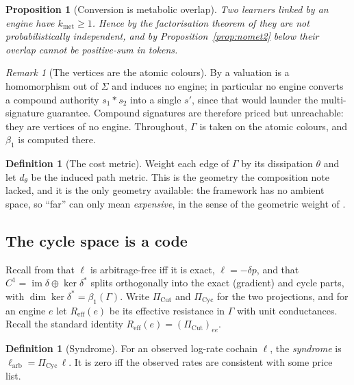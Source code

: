 \documentclass[11pt]{article}
\theoremstyle{plain}
\newtheorem{proposition}[theorem]{Proposition}
\theoremstyle{definition}
\newtheorem{definition}[theorem]{Definition}
\theoremstyle{remark}
\newtheorem{remark}[theorem]{Remark}
\newcommand{\Sig}{\Sigma}
\newcommand{\Reff}{R_{\mathrm{eff}}}
\newcommand{\bt}{\beta_1}
\newcommand{\Cyc}{\mathrm{Cyc}}
\newcommand{\Cut}{\mathrm{Cut}}
\begin{document}
\begin{proposition}[Conversion is metabolic overlap]\label{prop:convmet}
Two learners linked by an engine have $k_{\mathrm{met}} \geq 1$. Hence by
the factorisation theorem of \cite[\S4.2]{compose} they are not
probabilistically independent, and by
Proposition~\ref{prop:nomet2} below their overlap cannot be positive-sum in
tokens.
\end{proposition}

\begin{remark}[The vertices are the atomic colours]
By \cite[Prop.~4.4]{vtok} a valuation is a homomorphism out of $\Sig$ and
induces no engine; in particular no engine converts a compound authority
$s_1 * s_2$ into a single $s'$, since that would launder the multi-signature
guarantee. Compound signatures are therefore priced but unreachable: they
are vertices of no engine. Throughout, $\Gamma$ is taken on the atomic
colours, and $\bt$ is computed there.
\end{remark}

\begin{definition}[The cost metric]
Weight each edge of $\Gamma$ by its dissipation $\theta$ and let $d_\theta$
be the induced path metric. This is the geometry the composition note
lacked, and it is the only geometry available: the framework has no ambient
space, so ``far'' can only mean \emph{expensive}, in the sense of the
geometric weight of \cite{CE}.
\end{definition}

\subsection{The cycle space is a code}

Recall from \cite{vtok} that $\ell$ is arbitrage-free iff it is exact,
$\ell = -\delta p$, and that $C^1 = \operatorname{im}\delta \oplus
\ker\delta^\ast$ splits orthogonally into the exact (gradient) and cycle
parts, with $\dim\ker\delta^\ast = \bt(\Gamma)$. Write $\Pi_{\Cut}$ and
$\Pi_{\Cyc}$ for the two projections, and for an engine $e$ let $\Reff(e)$
be its effective resistance in $\Gamma$ with unit conductances. Recall the
standard identity $\Reff(e) = (\Pi_{\Cut})_{ee}$.

\begin{definition}[Syndrome]
For an observed log-rate cochain $\ell$, the \emph{syndrome} is
$\ell_{\mathrm{arb}} = \Pi_{\Cyc}\,\ell$. It is zero iff the observed rates
are consistent with some price list.
\end{definition}
\end{document}
